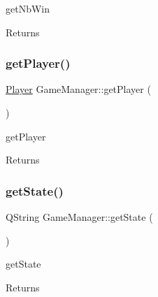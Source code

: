 get\+Nb\+Win 

\begin{DoxyReturn}{Returns}

\end{DoxyReturn}
\mbox{\label{class_game_manager_aebb883b6b25f5e017d315f692d5cd5a1}} 
\subsubsection{\texorpdfstring{get\+Player()}{getPlayer()}}
{\footnotesize\ttfamily \mbox{\hyperlink{class_player}{Player}} Game\+Manager\+::get\+Player (\begin{DoxyParamCaption}{ }\end{DoxyParamCaption})\hspace{0.3cm}{\ttfamily [inline]}}



get\+Player 

\begin{DoxyReturn}{Returns}

\end{DoxyReturn}
\mbox{\label{class_game_manager_a0eb6a90c2608f741f37d870a7b90255c}} 
\subsubsection{\texorpdfstring{get\+State()}{getState()}}
{\footnotesize\ttfamily Q\+String Game\+Manager\+::get\+State (\begin{DoxyParamCaption}{ }\end{DoxyParamCaption})\hspace{0.3cm}{\ttfamily [inline]}}



get\+State 

\begin{DoxyReturn}{Returns}

\end{DoxyReturn}
\mbox{\label{class_game_manager_ae28734a8c38cffbd7fc2ab4f8a996543}} 
